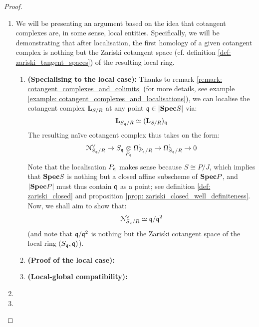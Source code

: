                     \begin{proof}
                        \noindent
                        \begin{enumerate}
                            \item We will be presenting an argument based on the idea that cotangent complexes are, in some sense, local entities. Specifically, we will be demonstrating that after localisation, the first homology of a given cotangent complex is nothing but the Zariski cotangent space (cf. definition \ref{def: zariski_tangent_spaces}) of the resulting local ring.
                                \begin{enumerate}
                                    \item \textbf{(Specialising to the local case):} Thanks to remark \ref{remark: cotangent_complexes_and_colimits} (for more details, see example \ref{example: cotangent_complexes_and_localisations}), we can localise the cotangent complex $\mathbf{L}_{S/R}$ at any point $\mathfrak{q} \in |\mathbf{Spec} S|$ via:
                                        $$\mathbf{L}_{S_{\mathfrak{q}}/R} \simeq (\mathbf{L}_{S/R})_{\mathfrak{q}}$$
                                    The resulting na\"ive cotangent complex thus takes on the form:
                                        $$\calN^{\vee}_{S_{\q}/R} \to S_{\q} \tensor_{P_{\q}} \Omega^1_{P_{\q}/R} \to \Omega^1_{S_{\q}/R} \to 0$$
                                    Note that the localisation $P_{\mathfrak{q}}$ makes sense because $S \cong P/J$, which implies that $\mathbf{Spec} S$ is nothing but a closed affine subscheme of $\mathbf{Spec} P$, and $|\mathbf{Spec} P|$ must thus contain $\mathfrak{q}$ as a point; see definition \ref{def: zariski_closed} and proposition \ref{prop: zariski_closed_well_definiteness}. Now, we shall aim to show that:
                                        $$\mathcal{N}^{\vee}_{S_{\mathfrak{q}}/R} \simeq \mathfrak{q}/\mathfrak{q}^2$$
                                    (and note that $\mathfrak{q}/\mathfrak{q}^2$ is nothing but the Zariski cotangent space of the local ring $(S_{\mathfrak{q}}, \mathfrak{q})$).
                                    \item \textbf{(Proof of the local case):}
                                    \item \textbf{(Local-global compatibility):}
                                \end{enumerate}
                            \item 
                            \item 
                        \end{enumerate}
                    \end{proof}
